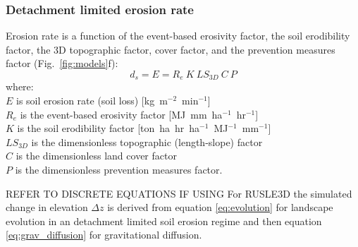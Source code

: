 \documentclass[gmd, manuscript]{copernicus}
\begin{document}

\subsubsection{Detachment limited erosion rate}

Erosion rate is a function of the event-based erosivity factor, 
the soil erodibility factor, the 3D topographic factor, cover factor, and the prevention measures factor 
(Fig.~\ref{fig:models}f):
%
\begin{equation}
\label{eq:rusle}
{d_s = E = R_e ~ K ~ LS_{3D} ~ C ~ P}
\end{equation}
%
{\small
\noindent
where: \\
\noindent
\hspace*{0.5em} $E$ is soil erosion rate (soil loss) [\unit{kg~m}$^{-2}$~\unit{min}$^{-1}$]\\
\hspace*{0.5em} $R_e$ is the event-based erosivity factor [\unit{MJ~mm~ha}$^{-1}$~\unit{hr}$^{-1}$]\\
\hspace*{0.5em} $K$ is the soil erodibility factor [\unit{ton~ha~hr~ha}$^{-1}$~\unit{MJ}$^{-1}$~\unit{mm}$^{-1}$]\\
\hspace*{0.5em} $LS_{3D}$ is the dimensionless topographic (length-slope) factor\\
\hspace*{0.5em} $C$ is the dimensionless land cover factor\\
\hspace*{0.5em} $P$ is the dimensionless prevention measures factor.\\
}

\noindent
REFER TO DISCRETE EQUATIONS IF USING
For RUSLE3D the simulated change in elevation 
$\Delta z$
is derived from 
equation \ref{eq:evolution}
for landscape evolution in an detachment limited soil erosion regime
and then equation \ref{eq:grav_diffusion}
for gravitational diffusion.

\end{document}

